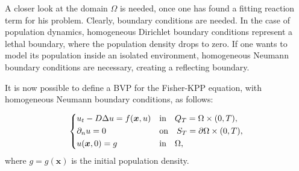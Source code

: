 A closer look at the domain \(\Omega\) is needed, once one has found a fitting reaction term for his problem. Clearly, boundary conditions are needed. In the case of population dynamics, homogeneous Dirichlet boundary conditions represent a lethal boundary, where the population density drops to zero. If one wants to model its population inside an isolated environment, homogeneous Neumann boundary conditions are necessary, creating a reflecting boundary. 

It is now possible to define a BVP for the Fisher-KPP equation, with homogeneous Neumann boundary conditions, as follows:

\begin{equation}
    \begin{dcases}
        u_t - D \Delta u = f(\bm{x}, u) & \text{in} \quad Q_T = \Omega \times (0, T), \\
        \partial_{n}u = 0 & \text{on} \quad S_T = \partial \Omega \times (0, T), \\
        u(\bm{x}, 0) = g & \text{in} \quad \Omega,
    \end{dcases}
    \label{eq:fisher-kpp-bvp}
\end{equation}
where \(g = g(\bm{x})\) is the initial population density.

